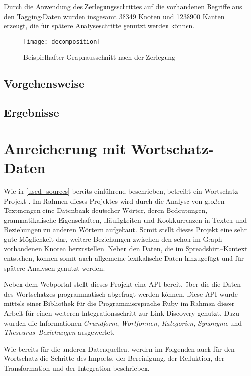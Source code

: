 Durch die Anwendung des Zerlegungsschrittes auf die vorhandenen Begriffe aus den Tagging-Daten wurden insgesamt \num{38349} Knoten und \num{1238900} Kanten erzeugt, die für spätere Analyseschritte genutzt werden können.

\begin{figure}
\centering
\texttt{[image: decomposition]}
\caption{Beispielhafter Graphausschnitt nach der Zerlegung}
\label{fig:decomposition}
\end{figure}

\subsection{Vorgehensweise}

\subsection{Ergebnisse}

\section{Anreicherung mit Wortschatz-Daten}
\label{wortschatz}

Wie in \cref{used_sources} bereits einführend beschrieben, betreibt ein Wortschatz--Projekt \cite{ws2013}. Im Rahmen dieses Projektes wird durch die Analyse von großen Textmengen eine Datenbank deutscher Wörter, deren Bedeutungen, grammatikalische Eigenschaften, Häufigkeiten und Kookkurrenzen in Texten und Beziehungen zu anderen Wörtern aufgebaut. Somit stellt dieses Projekt eine sehr gute Möglichkeit dar, weitere Beziehungen zwischen den schon im Graph vorhandenen Knoten herzustellen. Neben den Daten, die im Spreadshirt--Kontext entstehen, können somit auch allgemeine lexikalische Daten hinzugefügt und für spätere Analysen genutzt werden.

Neben dem Webportal stellt dieses Projekt eine API bereit, über die die Daten des Wortschatzes programmatisch abgefragt werden können. Diese API wurde mittels einer Bibliothek für die Programmiersprache Ruby \cite{wlapi2013} im Rahmen dieser Arbeit für einen weiteren Integrationsschritt zur Link Discovery genutzt. Dazu wurden die Informationen \emph{Grundform}, \emph{Wortformen}, \emph{Kategorien}, \emph{Synonyme} und \emph{Thesaurus--Beziehungen} ausgewertet.

Wie bereits für die anderen Datenquellen, werden im Folgenden auch für den Wortschatz die Schritte des Imports, der Bereinigung, der Reduktion, der Transformation und der Integration beschrieben.

